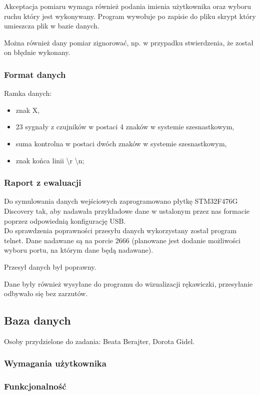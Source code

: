 \documentclass{article}
\begin{document}
Akceptacja pomiaru wymaga również podania imienia użytkownika oraz wyboru ruchu który jest wykonywany. Program wywołuje po zapisie do pliku skrypt który umieszcza plik w bazie danych.

Można również dany pomiar zignorować, np. w przypadku stwierdzenia, że został on błędnie wykonany.

\subsubsection{Format danych}
Ramka danych:
\begin{itemize}
    \item znak X,
    \item 23 sygnały z czujników w postaci 4 znaków w systemie szesnastkowym,
    \item suma kontrolna w postaci dwóch znaków w systemie szesnastkowym,
    \item znak końca linii \backslash r \backslash n;
\end{itemize}
\subsubsection{Raport z ewaluacji}
Do symulowania danych wejściowych zaprogramowano płytkę STM32F476G Discovery tak, aby nadawała przykładowe dane w ustalonym przez nas formacie poprzez odpowiednią konfigurację USB.  \\
Do sprawdzenia poprawności przesyłu danych wykorzystany został program telnet. Dane nadawane są na porcie 2666 (planowane jest dodanie możliwości wyboru portu, na którym dane będą nadawane). 

Przesył danych był poprawny. 

Dane były również wysyłane do programu do wizualizacji rękawiczki, przesyłanie odbywało się bez zarzutów.





\subsection{Baza danych}
Osoby przydzielone do zadania: Beata Berajter, Dorota Gidel.
\subsubsection{Wymagania użytkownika}

\subsubsection{Funkcjonalność}
\end{document}

